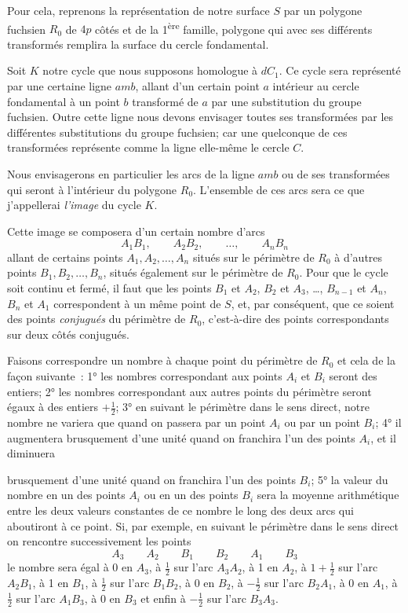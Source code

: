 \documentclass{article}
\begin{document}
Pour cela, reprenons la représentation de notre surface $S$ par un polygone fuchsien $R_{0}$ de $4p$ côtés et de la 1\textsuperscript{ère} famille, polygone qui avec ses différents transformés remplira la surface du cercle fondamental.

Soit $K$ notre cycle que nous supposons homologue à $dC_{1}$. Ce cycle sera représenté par une certaine ligne $amb$, allant d'un certain point $a$ intérieur au cercle fondamental à un point $b$ transformé de $a$ par une substitution du groupe fuchsien. Outre cette ligne nous devons envisager toutes ses transformées par les différentes substitutions du groupe fuchsien; car une quelconque de ces transformées représente comme la ligne elle-même le cercle $C$.

Nous envisagerons en particulier les arcs de la ligne $amb$ ou de ses transformées qui seront à l'intérieur du polygone $R_{0}$. L'ensemble de ces arcs sera ce que j'appellerai \emph{l'image} du cycle $K$.

Cette image se composera d'un certain nombre d'arcs
\[ A_{1}B_{1}, \qquad A_{2}B_{2}, \qquad \ldots, \qquad A_{n}B_{n} \]
allant de certains points $A_{1}, A_{2}, \ldots, A_{n}$ situés sur le périmètre de $R_{0}$ à d'autres points $B_{1}, B_{2}, \ldots, B_{n}$, situés également sur le périmètre de $R_{0}$. Pour que le cycle soit continu et fermé, il faut que les points $B_{1}$ et $A_{2}$, $B_{2}$ et $A_{3}$, \ldots, $B_{n-1}$ et $A_{n}$, $B_{n}$ et $A_{1}$ correspondent à un même point de $S$, et, par conséquent, que ce soient des points \emph{conjugués} du périmètre de $R_{0}$, c'est-à-dire des points correspondants sur deux côtés conjugués.

Faisons correspondre un nombre à chaque point du périmètre de $R_{0}$ et cela de la façon suivante~: 1° les nombres correspondant aux points $A_{i}$ et $B_{i}$ seront des entiers; 2° les nombres correspondant aux autres points du périmètre seront égaux à des entiers $+ \frac{1}{2}$; 3° en suivant le périmètre dans le sens direct, notre nombre ne variera que quand on passera par un point $A_{i}$ ou par un point $B_{i}$; 4° il augmentera brusquement d'une unité quand on franchira l'un des points $A_{i}$, et il diminuera

brusquement d'une unité quand on franchira l'un des points $B_{i}$; 5° la valeur du nombre en un des points $A_{i}$ ou en un des points $B_{i}$ sera la moyenne arithmétique entre les deux valeurs constantes de ce nombre le long des deux arcs qui aboutiront à ce point. Si, par exemple, en suivant le périmètre dans le sens direct on rencontre successivement les points
\[ A_{3} \qquad A_{2} \qquad B_{1} \qquad B_{2} \qquad A_{1} \qquad B_{3} \]
le nombre sera égal à 0 en $A_{3}$, à $\frac{1}{2}$ sur l'arc $A_{3}A_{2}$, à 1 en $A_{2}$, à $1 + \frac{1}{2}$ sur l'arc $A_{2}B_{1}$, à 1 en $B_{1}$, à $\frac{1}{2}$ sur l'arc $B_{1}B_{2}$, à 0 en $B_{2}$, à $-\frac{1}{2}$ sur l'arc $B_{2}A_{1}$, à 0 en $A_{1}$, à $\frac{1}{2}$ sur l'arc $A_{1}B_{3}$, à 0 en $B_{3}$ et enfin à $-\frac{1}{2}$ sur l'arc $B_{3}A_{3}$.
\end{document}

